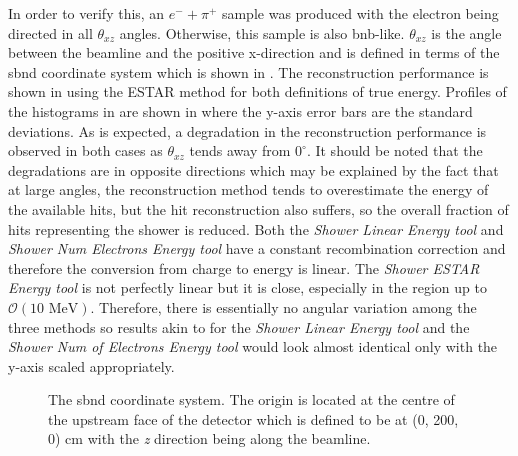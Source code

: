 In order to verify this, an  $e^- + \pi^+$ sample was produced with the electron being directed in all $\theta_{xz}$ angles. Otherwise, this sample is also \gls{bnb}-like. $\theta_{xz}$ is the angle between the beamline and the positive x-direction and is defined in terms of the \gls{sbnd} coordinate system which is shown in . The reconstruction performance is shown in  using the ESTAR method for both definitions of true energy. Profiles of the histograms in  are shown in  where the y-axis error bars are the standard deviations. As is expected, a degradation in the reconstruction performance is observed in both cases as $\theta_{xz}$ tends away from $0^\circ$. It should be noted that the degradations are in opposite directions which may be explained by the fact that at large angles, the reconstruction method tends to overestimate the energy of the available hits, but the hit reconstruction also suffers, so the overall fraction of hits representing the shower is reduced. Both the \textit{Shower Linear Energy tool} and \textit{Shower Num Electrons Energy tool} have a constant recombination correction and therefore the conversion from charge to energy is linear. The \textit{Shower ESTAR Energy tool} is not perfectly linear but it is close, especially in the region up to $\mathcal{O}(10 \text{ MeV})$. Therefore, there is essentially no angular variation among the three methods so results akin to  for the \textit{Shower Linear Energy tool} and the \textit{Shower Num of Electrons Energy tool} would look almost identical only with the y-axis scaled appropriately. 
\begin{figure}[h!]
    \centering
    

    \caption[The \gls{sbnd} coordinate system.]{The \gls{sbnd} coordinate system. The origin is located at the centre of the upstream face of the detector which is defined to be at (0, 200, 0) cm with the \textit{z} direction being along the beamline.}
    \label{fig:sbnd_coordinate_system}
\end{figure}


